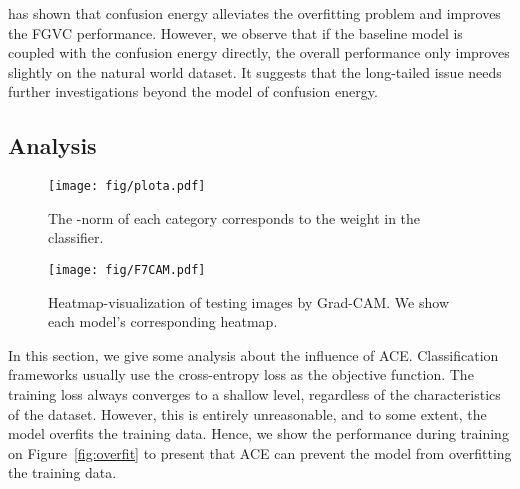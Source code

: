 \documentclass{article}
\begin{document}
\citet{dubey2018pairwise} has shown that confusion energy alleviates the overfitting problem and improves the FGVC performance. However, we observe that if the baseline model is coupled with the confusion energy directly, the overall performance only improves slightly on the natural world dataset. It suggests that the long-tailed issue needs further investigations beyond the model of confusion energy. 

\subsection{Analysis}


\begin{figure*}[t]
    \centering
    \vspace{-10pt}
    \caption{Observation of the overfitting issue. (a) and (b) shows that there is a large gap between training accuracy and validation performance. (c) presents ACE alleviates the overfitting issue and improves the validation performance.}
    \label{fig:overfit}
    \vspace{-10pt}
\end{figure*}

\begin{figure}[t!]
    \centering
    \texttt{[image: fig/plota.pdf]}
    \vspace{-15pt}
    \caption{The -norm of each category corresponds to the weight  in the classifier.}
    \label{fig:w_norm}
    \vspace{-15pt}
\end{figure}

\begin{figure}[ht!]
    \centering
    \texttt{[image: fig/F7CAM.pdf]}
    \vspace{-15pt}
    \caption{Heatmap-visualization of testing images by Grad-CAM. We show each model's corresponding heatmap. 
    }
    \label{fig:cam}
    \vspace{-15pt}
\end{figure}

In this section, we give some analysis about the influence of ACE. Classification frameworks usually use the cross-entropy loss as the objective function. The training loss always converges to a shallow level, regardless of the characteristics of the dataset. However, this is entirely unreasonable, and to some extent, the model overfits the training data. Hence, we show the performance during training on Figure~\ref{fig:overfit} to present that ACE can prevent the model from overfitting the training data.
\end{document}

